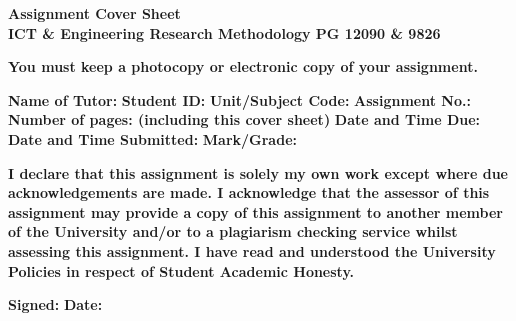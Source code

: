 \documentclass[a4paper,12pt]{article}
\begin{document}
\begin{center}
    \textbf{\LARGE Assignment Cover Sheet} \\
    \vspace{0.5cm}
    \textbf{\large ICT \& Engineering Research Methodology PG 12090 \& 9826}
\end{center}

\vspace{1cm}

\noindent \textbf{You must keep a photocopy or electronic copy of your assignment.}

\vspace{1cm}

\noindent \textbf{Name of Tutor:} \hrulefill \newline
\newline
\noindent \textbf{Student ID:} \hrulefill \newline
\newline
\noindent \textbf{Unit/Subject Code:} \hrulefill \newline
\newline
\noindent \textbf{Assignment No.:} \hrulefill \newline
\newline
\noindent \textbf{Number of pages: (including this cover sheet)} \hrulefill \newline
\newline
\noindent \textbf{Date and Time Due:} \hrulefill \newline
\newline
\noindent \textbf{Date and Time Submitted:} \hrulefill \newline
\newline
\noindent \textbf{Mark/Grade:} \hrulefill

\vspace{1.5cm}

\noindent \textbf{I declare that this assignment is solely my own work except where due acknowledgements are made. I acknowledge that the assessor of this assignment may provide a copy of this assignment to another member of the University and/or to a plagiarism checking service whilst assessing this assignment. I have read and understood the University Policies in respect of Student Academic Honesty.}

\vspace{2cm}

\noindent \textbf{Signed:} \hrulefill \quad \textbf{Date:} \hrulefill
\end{document}
